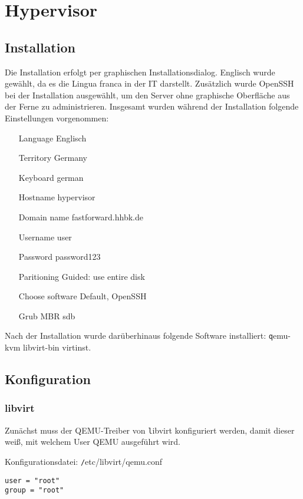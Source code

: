 \section{Hypervisor}

\subsection{Installation}

Die Installation erfolgt per graphischen Installationsdialog. Englisch wurde gewählt, da es die Lingua franca in der IT darstellt. Zusätzlich wurde OpenSSH bei der Installation ausgewählt, um den Server ohne graphische Oberfläche aus der Ferne zu administrieren. Insgesamt wurden während der Installation folgende Einstellungen vorgenommen:
\begin{itemize}[leftmargin=+1in]
	\item[Language] Englisch
	\item[Territory] Germany
	\item[Keyboard] german
	\item[Hostname] hypervisor
	\item[Domain name] fastforward.hhbk.de
	\item[Username] user
	\item[Password] password123
	\item[Paritioning] Guided: use entire disk
	\item[Choose software] Default, OpenSSH
	\item[Grub MBR] sdb
\end{itemize}

Nach der Installation wurde darüberhinaus folgende Software installiert: {\texttt qemu-kvm libvirt-bin virtinst}.

\subsection{Konfiguration}

\subsubsection{libvirt}

Zunächst muss der QEMU-Treiber von {\texttt libvirt} konfiguriert werden, damit dieser weiß, mit welchem User QEMU ausgeführt wird.\newline

Konfigurationsdatei: {\texttt /etc/libvirt/qemu.conf}
\begin{lstlisting}
user = "root"
group = "root"
\end{lstlisting}

